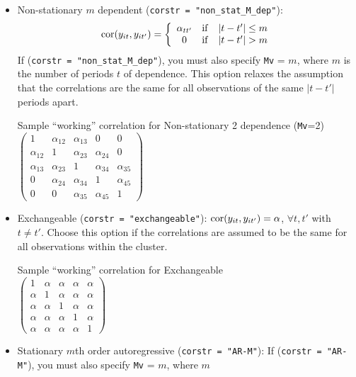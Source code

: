 \begin{itemize}
\begin{itemize}
\item Non-stationary $m$ dependent (\texttt{corstr =
    "non\_stat\_M\_dep"}):
$${\rm cor}(y_{it}, y_{it'})=\left\{\begin{array}{ccc}
      \alpha_{tt'} & {\rm if} & |t-t'|\le m \\ 0 & {\rm if}
      & |t-t'| > m
    \end{array}\right.$$
If (\texttt{corstr = "non\_stat\_M\_dep"}), you must also specify
\texttt{Mv} = $m$, where $m$ is the number of periods $t$ of
dependence.  This option relaxes the assumption that the
correlations are the same for all observations of the same $|t-t'|$
periods apart.
\begin{center}
Sample ``working'' correlation for Non-stationary 2 dependence ({\tt Mv}=2)\\
\bigskip
$\left( \begin{array}{ccccc}
1 & \alpha_{12} & \alpha_{13} & 0 & 0 \\
\alpha_{12} & 1 & \alpha_{23} & \alpha_{24} & 0 \\
\alpha_{13} & \alpha_{23} & 1 & \alpha_{34} & \alpha_{35} \\
0 & \alpha_{24} & \alpha_{34} & 1 & \alpha_{45} \\
0 & 0 & \alpha_{35} & \alpha_{45} & 1
\end{array} \right) $
\end{center}
\item Exchangeable (\texttt{corstr = "exchangeable"}): ${\rm
    cor}(y_{it}, y_{it'})=\alpha$, $\forall t, t'$ with $t\ne t'$.  Choose this option if the correlations are assumed to be the same for all observations within the cluster.
\begin{center}
Sample ``working'' correlation for Exchangeable\\
\bigskip
$\left( \begin{array}{ccccc}
1 & \alpha & \alpha & \alpha & \alpha \\
\alpha & 1 & \alpha & \alpha & \alpha \\
\alpha & \alpha & 1 & \alpha & \alpha \\
\alpha & \alpha & \alpha & 1 & \alpha \\
\alpha & \alpha & \alpha & \alpha & 1
\end{array} \right) $
\end{center}
\item Stationary $m$th order autoregressive (\texttt{corstr = "AR-M"}): If (\texttt{corstr = "AR-M"}), you must also specify \texttt{Mv} = $m$, where $m$

\end{itemize}
\end{itemize}
